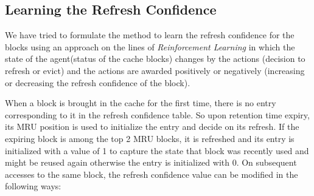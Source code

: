 \documentclass[sigconf]{acmart}
\begin{document}
\subsection{Learning the Refresh Confidence}

We have tried to formulate the method to learn the refresh confidence for the blocks using an approach on the lines of \textit{Reinforcement Learning} in which
the state of the agent(status of the cache blocks) changes by the actions (decision to refresh or evict) and the actions are awarded positively or negatively (increasing or decreasing the refresh confidence of the block). 

When a block is brought in the cache for the first time, there is no entry corresponding to it in the refresh confidence table. So upon retention time expiry, its MRU position is used to initialize the entry and decide on its refresh. If the expiring block is among the top 2 MRU blocks, it is refreshed and its entry is initialized with a value of 1 to capture the state that block was recently used and might be reused again otherwise the entry is initialized with 0. On subsequent accesses to the same block, the refresh confidence value can be modified in the following ways:
\end{document}
